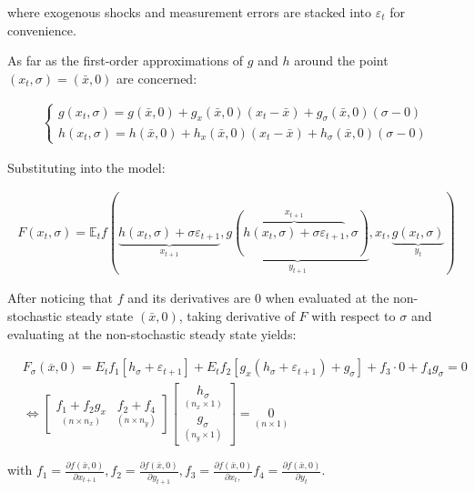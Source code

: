 \documentclass{pracamgr}
\numberwithin{equation}{section}
\begin{document}
where exogenous shocks and measurement errors are stacked into $\varepsilon_{t}$ for convenience.

As far as the first-order approximations of $g$ and $h$ around the point $(x_{t}, \sigma) = (\bar{x}, 0)$ are concerned:

\begin{align}
\left\{
\begin{array}{cl}
g(x_{t}, \sigma) = g(\bar{x}, 0) + g_{x}(\bar{x}, 0)(x_{t} - \bar{x}) + g_{\sigma}(\bar{x}, 0)(\sigma - 0) \\
h(x_{t}, \sigma) = h(\bar{x}, 0) + h_{x}(\bar{x}, 0)(x_{t} - \bar{x}) + h_{\sigma}(\bar{x}, 0)(\sigma - 0)
\end{array}
\right.
\end{align}

Substituting into the model:

\begin{align}
F(x_{t}, \sigma) = \mathbb{E}_{t} f \left( \underbrace{h(x_{t}, \sigma) + \sigma \varepsilon_{t+1}}_{x_{t+1}}, \underbrace{g \left( \overbrace{h\left(x_{t}, \sigma \right) + \sigma \varepsilon_{t+1}}^{x_{t+1}}, \sigma \right)}_{y_{t+1}}, x_{t}, \underbrace{g(x_{t}, \sigma)}_{y_{t}} \right)
\end{align}

After noticing that $f$ and its derivatives are 0 when evaluated at the non-stochastic steady state $\left(\bar{x}, 0\right)$, taking derivative of $F$ with respect to $\sigma$ and evaluating at the non-stochastic steady state yields:

\begin{eqnarray}
&F_\sigma(\overline{x},0) = E_t f_1[h_\sigma + \varepsilon_{t+1}] + E_t f_2 [g_x(h_\sigma+ \varepsilon_{t+1})+g_\sigma] + f_3\cdot 0 + f_4 g_\sigma = 0 \nonumber \\
 &  \iff \begin{bmatrix} \underset{(n \times n_x)}{f_1 + f_2 g_x} & \underset{(n\times n_y)}{f_2 +f_4}\end{bmatrix} \begin{bmatrix} \underset{(n_x \times 1)}{h_\sigma} \\ \underset{(n_y \times 1)}{g_\sigma} \end{bmatrix} = \underset{(n \times 1)}{0}
  \end{eqnarray}

with $f_1= \frac{\partial f (\bar{x}, 0)}{\partial x_{t+1}}, f_2=  \frac{\partial f (\bar{x}, 0)}{\partial y_{t+1}},  f_3=\frac{\partial f (\bar{x}, 0)}{\partial x_{t},}  f_4=\frac{\partial f (\bar{x}, 0)}{\partial y_{t}}$. \\
\end{document}
